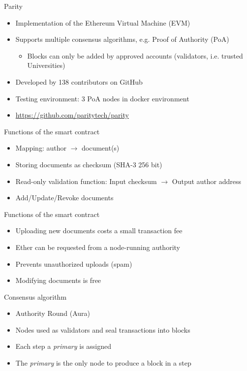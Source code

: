 \documentclass[10pt]{beamer}
\begin{document}
\begin{frame}{Parity}
	\begin{itemize}
		\item Implementation of the Ethereum Virtual Machine (EVM)
		\item Supports multiple consensus algorithms, e.g. Proof of Authority (PoA)
		\begin{itemize}
			\item Blocks can only be added by approved accounts (validators, i.e. trusted Universities)
		\end{itemize}
		\item Developed by 138 contributors on GitHub
		\item Testing environment: 3 PoA nodes in docker environment
		\item \url{https://github.com/paritytech/parity}
	\end{itemize}
\end{frame}

\begin{frame}{Functions of the smart contract}
	\begin{itemize}
		\item Mapping: author  $\rightarrow$ document(s)
		\item Storing documents as checksum (SHA-3 256 bit)
		\item Read-only validation function: Input checksum $\rightarrow$ Output author address
		\item Add/Update/Revoke documents
	\end{itemize}
\end{frame}

\begin{frame}{Functions of the smart contract}
	\begin{itemize}
		\item Uploading new documents costs a small transaction fee
		\item Ether can be requested from a node-running authority
		\item Prevents unauthorized uploads (spam)
		\item Modifying documents is free
	\end{itemize}
\end{frame}

\begin{frame}{Consensus algorithm}
	\begin{itemize}
		\item Authority Round (Aura)
		\item Nodes used as validators and seal transactions into blocks
		\item Each step a \textit{primary} is assigned
		\item The \textit{primary} is the only node to produce a block in a step
	\end{itemize}
\end{frame}
\end{document}
